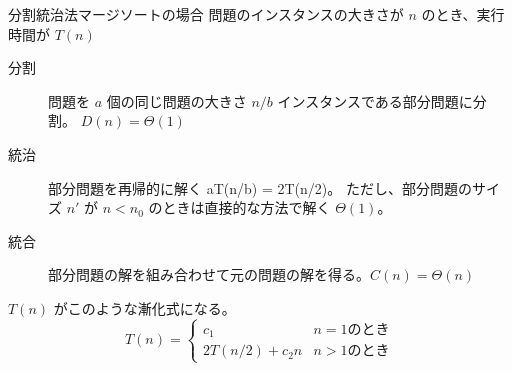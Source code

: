 \documentclass[unicode,11pt,aspectratio=169,hide notes]{beamer} %
\begin{document}

\begin{frame}{分割統治法}{マージソートの場合}
  問題のインスタンスの大きさが $n$ のとき、実行時間が \alert{$T(n)$}
  \begin{description}
    \item[分割] 問題を $a$ 個の同じ問題の大きさ $n/b$ インスタンスである部分問題に分割。
    \alert{$D(n) = \Theta(1)$}
    \item[統治] 部分問題を再帰的に解く \alert{aT(n/b) = 2T(n/2)}。
    ただし、部分問題のサイズ $n'$ が $n < n_0$ のときは直接的な方法で解く \alert{$\Theta(1)$}。
    \item[統合] 部分問題の解を組み合わせて元の問題の解を得る。\alert{$C(n) = \Theta(n)$}
  \end{description}

  \alert{$T(n)$} がこのような漸化式になる。
  \[
    T(n) = 
    \begin{cases}
      c_1 & n = 1 \text{のとき} \\
      2T(n/2) + c_2n & n > 1 \text{のとき}
    \end{cases}
  \]
\end{frame}

\end{document}
